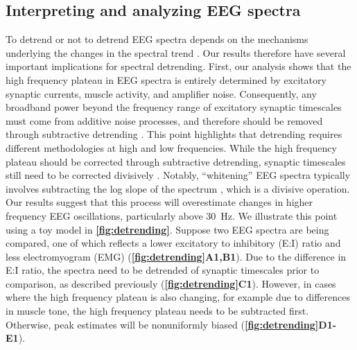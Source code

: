\subsection{Interpreting and analyzing EEG spectra}
To detrend or not to detrend EEG spectra depends on the mechanisms underlying the changes in the spectral trend \cite{Brake2024}. Our results therefore have several important implications for spectral detrending. First, our analysis shows that the high frequency plateau in EEG spectra is entirely determined by excitatory synaptic currents, muscle activity, and amplifier noise. Consequently, any broadband power beyond the frequency range of excitatory synaptic timescales must come from additive noise processes, and therefore should be removed through subtractive detrending \cite{Miller2009}. This point highlights that detrending requires different methodologies at high and low frequencies. While the high frequency plateau should be corrected through subtractive detrending, synaptic timescales still need to be corrected divisively \cite{Brake2024}. Notably, ``whitening'' EEG spectra typically involves subtracting the log slope of the spectrum \cite{Donoghue2020, Buzsaki2004}, which is a divisive operation. Our results suggest that this process will overestimate changes in higher frequency EEG oscillations, particularly above \qty{30}{\hertz}. We illustrate this point using a toy model in \textbf{\autoref{fig:detrending}}. Suppose two EEG spectra are being compared, one of which reflects a lower excitatory to inhibitory (E:I) ratio and less electromyogram (EMG) (\textbf{\autoref{fig:detrending}A1,B1}). Due to the difference in E:I ratio, the spectra need to be detrended of synaptic timescales prior to comparison, as described previously \cite{Brake2024,Gao2017} (\textbf{\autoref{fig:detrending}C1}). However, in cases where the high frequency plateau is also changing, for example due to differences in muscle tone, the high frequency plateau needs to be subtracted first. Otherwise, peak estimates will be nonuniformly biased (\textbf{\autoref{fig:detrending}D1-E1}).

